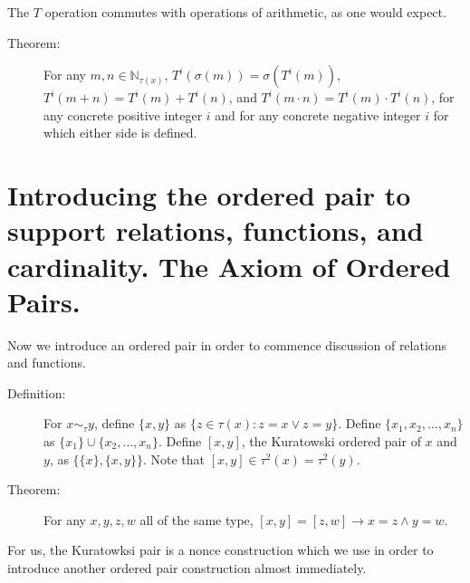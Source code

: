 \documentclass[12pt]{article}
\begin{document}
The $T$ operation commutes with operations of arithmetic, as one would expect.

\begin{description}

\item[Theorem:]  For any $m,n \in \mathbb N_{\tau(x)}$, $T^i(\sigma(m)) = \sigma(T^i(m))$, $T^i(m+n) = T^i(m)+T^i(n)$, and $T^i(m\cdot n) = T^i(m) \cdot T^i(n)$, for any concrete positive integer $i$ and for any concrete negative integer $i$ for which either side is defined.

\end{description}
\newpage
\section{Introducing the ordered pair to support relations, functions, and cardinality.  The Axiom of Ordered Pairs.}

Now we introduce an ordered pair in order to commence discussion of relations and functions.

\begin{description}

\item[Definition:]  For $x \sim_\tau y$, define $\{x,y\}$ as $\{z \in \tau(x):z = x \vee z = y\}$.  Define $\{x_1,x_2,\ldots,x_n\}$ as $\{x_1\} \cup \{x_2,\ldots,x_n\}$.
Define $[x,y]$, the Kuratowski ordered pair of $x$ and $y$, as $\{\{x\},\{x,y\}\}$.  Note that $[x,y] \in \tau^2(x) = \tau^2(y)$.

\item[Theorem:]  For any $x,y,z,w$ all of the same type, $[x,y] = [z,w] \rightarrow x=z \wedge y=w$.

\end{description}

For us, the Kuratowksi pair is a nonce construction which we use in order to introduce another ordered pair construction almost immediately.
\end{document}
